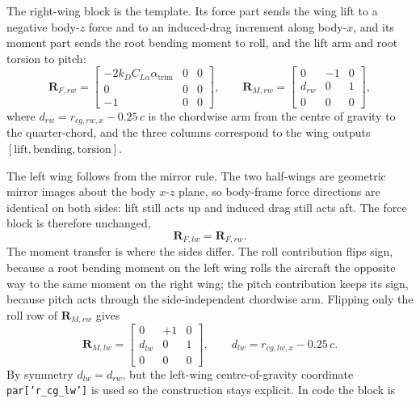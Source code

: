 The right-wing block is the template. Its force part sends the wing lift to a negative body-$z$ force and to an induced-drag increment along body-$x$, and its moment part sends the root bending moment to roll, and the lift arm and root torsion to pitch:
\begin{equation}
    \mathbf{R}_{F,rw} =
    \begin{bmatrix} -2 k_D C_{L\alpha}\alpha_{\text{trim}} & 0 & 0 \\ 0 & 0 & 0 \\ -1 & 0 & 0 \end{bmatrix},
    \qquad
    \mathbf{R}_{M,rw} =
    \begin{bmatrix} 0 & -1 & 0 \\ d_{rw} & 0 & 1 \\ 0 & 0 & 0 \end{bmatrix},
    \label{eq:Rrw}
\end{equation}
where $d_{rw}=r_{cg,rw,x}-0.25\,c$ is the chordwise arm from the centre of gravity to the quarter-chord, and the three columns correspond to the wing outputs $[\text{lift}, \text{bending}, \text{torsion}]$.

The left wing follows from the mirror rule. The two half-wings are geometric mirror images about the body $x$-$z$ plane, so body-frame force directions are identical on both sides: lift still acts up and induced drag still acts aft. The force block is therefore unchanged,
\begin{equation}
    \mathbf{R}_{F,lw} = \mathbf{R}_{F,rw}.
    \label{eq:Rflw}
\end{equation}
The moment transfer is where the sides differ. The roll contribution flips sign, because a root bending moment on the left wing rolls the aircraft the opposite way to the same moment on the right wing; the pitch contribution keeps its sign, because pitch acts through the side-independent chordwise arm. Flipping only the roll row of $\mathbf{R}_{M,rw}$ gives
\begin{equation}
    \mathbf{R}_{M,lw} =
    \begin{bmatrix} 0 & +1 & 0 \\ d_{lw} & 0 & 1 \\ 0 & 0 & 0 \end{bmatrix},
    \qquad d_{lw}=r_{cg,lw,x}-0.25\,c .
    \label{eq:Rmlw}
\end{equation}
By symmetry $d_{lw}=d_{rw}$, but the left-wing centre-of-gravity coordinate \texttt{par['r\_cg\_lw']} is used so the construction stays explicit. In code the block is

